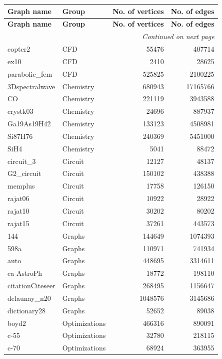 \begin{longtable}{|l|l|r|r|}
\hline
\textbf{Graph name} & \textbf{Group} & \textbf{No. of vertices} & \textbf{No. of edges} \\
\hline
\endfirsthead

\hline
\textbf{Graph name} & \textbf{Group} & \textbf{No. of vertices} & \textbf{No. of edges} \\
\hline
\endhead

\hline
\multicolumn{4}{r}{\textit{Continued on next page}} \\
\endfoot

\hline
\endlastfoot

copter2 & CFD & 55476 & 407714 \\
ex10 & CFD & 2410 & 28625 \\
parabolic\_fem & CFD & 525825 & 2100225 \\
3Dspectralwave & Chemistry & 680943 & 17165766 \\
CO & Chemistry & 221119 & 3943588 \\
crystk03 & Chemistry & 24696 & 887937 \\
Ga19As19H42 & Chemistry & 133123 & 4508981 \\
Si87H76 & Chemistry & 240369 & 5451000 \\
SiH4 & Chemistry & 5041 & 88472 \\
circuit\_3 & Circuit & 12127 & 48137 \\
G2\_circuit & Circuit & 150102 & 438388 \\
memplus & Circuit & 17758 & 126150 \\
rajat06 & Circuit & 10922 & 28922 \\
rajat10 & Circuit & 30202 & 80202 \\
rajat15 & Circuit & 37261 & 443573 \\
144 & Graphs & 144649 & 1074393 \\
598a & Graphs & 110971 & 741934 \\
auto & Graphs & 448695 & 3314611 \\
ca-AstroPh & Graphs & 18772 & 198110 \\
citationCiteseer & Graphs & 268495 & 1156647 \\
delaunay\_n20 & Graphs & 1048576 & 3145686 \\
dictionary28 & Graphs & 52652 & 89038 \\
boyd2 & Optimizations & 466316 & 890091 \\
c-55 & Optimizations & 32780 & 218115 \\
c-70 & Optimizations & 68924 & 363955 \\

\end{longtable}
